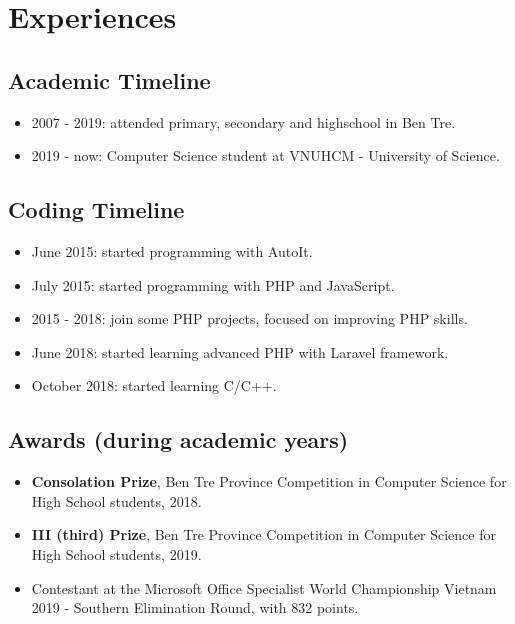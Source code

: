 \documentclass{article}
\begin{document}
    \section{Experiences}
        \subsection{Academic Timeline}
            \begin{itemize}
                \item 2007 - 2019: attended primary, secondary and highschool in Ben Tre.
                \item 2019 - now: Computer Science student at VNUHCM - University of Science.
            \end{itemize}

        \subsection{Coding Timeline}
            \begin{itemize}
                \item June 2015: started programming with AutoIt.
                \item July 2015: started programming with PHP and JavaScript.
                \item 2015 - 2018: join some PHP projects, focused on improving PHP skills.
                \item June 2018: started learning advanced PHP with Laravel framework.
                \item October 2018: started learning C/C++.
            \end{itemize}

        \subsection{Awards (during academic years)}
            \begin{itemize}
                \item {\textbf{Consolation Prize}}, Ben Tre Province Competition in Computer Science for High School students, 2018.
                \item {\textbf{III (third) Prize}}, Ben Tre Province Competition in Computer Science for High School students, 2019.
                \item Contestant at the Microsoft Office Specialist World Championship Vietnam 2019 - Southern Elimination Round, with 832 points.
            \end{itemize}
\end{document}
